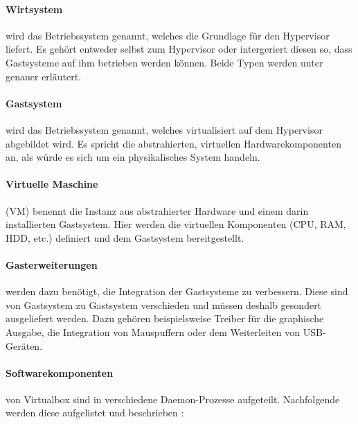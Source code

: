\paragraph{Wirtsystem} wird das Betriebssystem genannt, welches die Grundlage für den Hypervisor
liefert. Es gehört entweder selbst zum Hypervisor oder intergeriert diesen so, dass Gastsysteme
auf ihm betrieben werden können. Beide Typen werden unter  genauer
erläutert.

\paragraph{Gastsystem} wird das Betriebssystem genannt, welches virtualisiert auf dem Hypervisor
abgebildet wird. Es spricht die abstrahierten, virtuellen Hardwarekomponenten an, als würde
es sich um ein physikalisches System handeln.

\paragraph{Virtuelle Maschine} (VM) benennt die Instanz aus abstrahierter Hardware und einem
darin installierten Gastsystem. Hier werden die virtuellen Komponenten (CPU, RAM, HDD, etc.)
definiert und dem Gastsystem bereitgestellt.

\paragraph{Gasterweiterungen} werden dazu benötigt, die Integration der Gastsysteme zu verbessern.
Diese sind von Gastsystem zu Gastsystem verschieden und müssen deshalb gesondert ausgeliefert werden.
Dazu gehören beispielsweise Treiber für die graphische Ausgabe, die Integration von Mauspuffern
oder dem Weiterleiten von USB-Geräten.

\paragraph{Softwarekomponenten} von Virtualbox sind in verschiedene Daemon-Prozesse aufgeteilt.
Nachfolgende werden diese aufgelistet und beschrieben \cite{victor10}:\vspace*{5mm}

